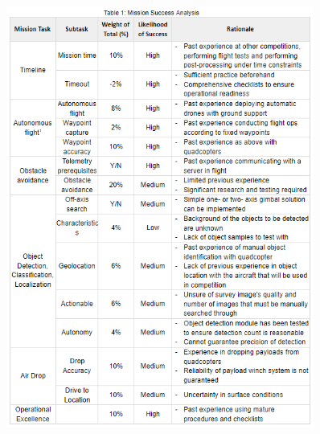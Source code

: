     \begin{figure}\centering
    \includegraphics[width=0.9\textwidth]{table/table_1.png}
    \caption*{}
    \label{fig:msa}
    \end{figure}



\endinput
